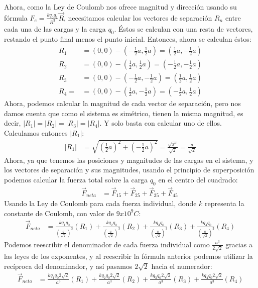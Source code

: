 \documentclass[12pt, letterpaper]{report}
\begin{document}
Ahora, como la Ley de Coulomb nos ofrece magnitud y dirección usando su fórmula $F_e = \frac{kq_0 q_1}{R^3}\vec{R}$, necesitamos calcular los vectores de separación $R_n$ entre cada una de las cargas y la carga $q_0$. Éstos se calculan con una resta de 
vectores, restando el punto final menos el punto inicial. Entonces, ahora se calculan éstos: 
\begin{align}
R_1 &= (0, 0) - (-\frac{1}{2}a, \frac{1}{2}a) = (\frac{1}{2}a, -\frac{1}{2}a)\\
R_2 &= (0, 0) - (\frac{1}{2}a, \frac{1}{2}a) = (-\frac{1}{2}a, -\frac{1}{2}a) \\ 
R_3 &= (0, 0) -  (-\frac{1}{2}a, -\frac{1}{2}a) = (\frac{1}{2}a, \frac{1}{2}a)\\
R_4 = &= (0, 0) -  (\frac{1}{2}a, -\frac{1}{2}a) = (-\frac{1}{2}a, \frac{1}{2}a)
\end{align}
Ahora, podemos calcular la magnitud de cada vector de separación, pero nos damos cuenta que como el sistema es simétrico, tienen la misma magnitud, es decir, $|R_1| = |R_2| = |R_3| = |R_4|$. Y solo basta con calcular uno de ellos. Calculamos entonces $|R_1|$: 
\begin{align}
|R_1| &= \sqrt{(\frac{1}{2}a)^2 + (-\frac{1}{2}a)^2} = \frac{\sqrt{x^2}}{\sqrt{2}} = \frac{a}{\sqrt{2}}
\end{align}
Ahora, ya que tenemos las posiciones y magnitudes de las cargas en el sistema, y los vectores de separación y sus magnitudes, 
usando el principio de superposición podemos calcular la fuerza total sobre la carga $q_0$ en el centro del cuadrado: 
\begin{align}
\vec{F}_{neta} &= \vec{F}_{15} + \vec{F}_{25} + \vec{F}_35 + \vec{F}_45\
\end{align}
Usando la Ley de Coulomb para cada fuerza individual, donde $k$ representa la constante de Coulomb, con valor de $9x10^9 C$:
\begin{align}
\vec{F}_{neta} &= \frac{kq_1q_0}{(\frac{a}{\sqrt{2}})^3}(R_1) + \frac{kq_2q_0}{(\frac{a}{\sqrt{2}})^3}(R_2) + \frac{kq_3q_0}{(\frac{a}{\sqrt{2}})^3}(R_3)
+ \frac{kq_4q_0}{(\frac{a}{\sqrt{2}})^3}(R_4)
\end{align}
Podemos reescribir el denominador de cada fuerza individual como $\frac{a^3}{2\sqrt{2}}$ gracias a las leyes de los exponentes, y al reescribir la fórmula anterior podemos utilizar la recíproca del denominador, y así 
pasamos $2\sqrt{2}$ hacia el numerador: 
\begin{align}
\vec{F}_{neta} &= \frac{kq_1q_0 2\sqrt{2}}{a^3}(R_1) + \frac{kq_2q_0 2\sqrt{2}}{a^3}(R_2) + \frac{kq_3q_0 2\sqrt{2}}{a^3}(R_3) + \frac{kq_4q_0 2\sqrt{2}}{a^3}(R_4)
\end{align}
\end{document}
